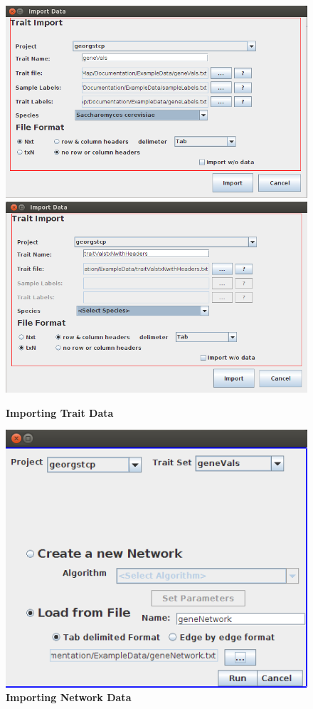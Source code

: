 \documentclass{article}
\begin{document}
\begin{figure}
\includegraphics[width=\textwidth]{Figure2a.png}
\includegraphics[width=\textwidth]{Figure2b.png}
\caption{\textbf{Importing Trait Data}}
\label{trait}
\end{figure}

\begin{figure}
\includegraphics[width=\textwidth]{Figure3.png}
\caption{\textbf{Importing Network Data}}
\label{network}
\end{figure}
\end{document}
